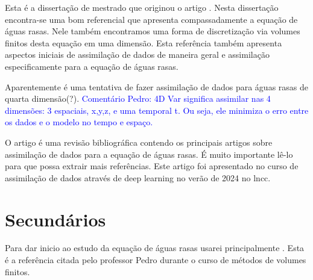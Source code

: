\documentclass[12pt,a4paper]{article}
\begin{document}
	\cite{disertacaoKhan} Esta é a dissertação de mestrado que originou o artigo \cite{kevlahan2019convergence}. Nesta dissertação encontra-se uma bom referencial que apresenta compassadamente a equação de águas rasas. Nele também encontramos uma forma de discretização via volumes finitos desta equação em uma dimensão. Esta referência também apresenta aspectos iniciais de assimilação de dados de maneira geral e assimilação especificamente para a equação de águas rasas.
	
	
	\cite{cstefuanescu2015pod} Aparentemente é uma tentativa de fazer assimilação de dados para águas rasas de quarta dimensão(?).
	\textcolor{blue}{Comentário Pedro: 4D Var significa assimilar nas 4 dimensões: 3 espaciais, x,y,z, e uma temporal t. Ou seja, ele minimiza o erro entre os dados e o modelo no tempo e espaço.}
	
	O artigo \cite{ghorbani2023data} é uma revisão bibliográfica contendo os principais artigos sobre assimilação de dados para a equação de águas rasas. É muito importante lê-lo para que possa extrair mais referências. Este artigo foi apresentado no curso de assimilação de dados através de deep learning no verão de 2024 no lncc.
	
	\section{Secundários}
	
	Para dar inicio ao estudo da equação de águas rasas usarei principalmente \cite{vallis2017atmospheric}. Esta é a referência citada pelo professor Pedro durante o curso de métodos de volumes finitos.
	
	\pagebreak
	
	
	
\end{document}
